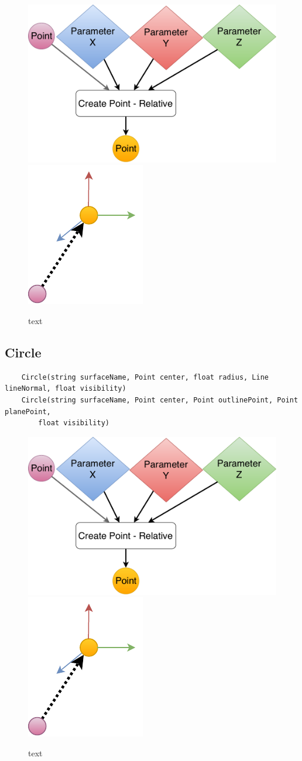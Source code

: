 \begin{figure}[H]
	\centering
	\includegraphics[height=0.3\textwidth]{obrazky-figures/Diagram/DP Navrh operacii-0D - Point2.pdf}
	\includegraphics[height=0.3\textwidth]{obrazky-figures/Diagram/Draw/1Points/DP Navrh operacii-0D - PointRelative.pdf}
	\caption{text}
	\label{fig:1}
\end{figure}

\subsection{Circle}
\begin{lstlisting}
	Circle(string surfaceName, Point center, float radius, Line lineNormal, float visibility)
	Circle(string surfaceName, Point center, Point outlinePoint, Point planePoint, 
	    float visibility)
\end{lstlisting}

\begin{figure}[H]
	\centering
	\includegraphics[height=0.3\textwidth]{obrazky-figures/Diagram/DP Navrh operacii-0D - Point2.pdf}
	\includegraphics[height=0.3\textwidth]{obrazky-figures/Diagram/Draw/1Points/DP Navrh operacii-0D - PointRelative.pdf}
	\caption{text}
	\label{fig:1}
\end{figure}


